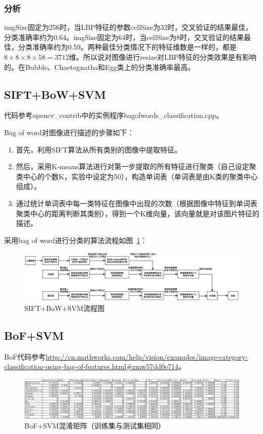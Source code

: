 \documentclass[12pt]{article}
\begin{document}
\subsubsection{分析}

imgSize固定为256时，当LBP特征的参数cellSize为32时，交叉验证的结果最佳，分类准确率约为0.64。imgSize固定为64时，当cellSize为8时，交叉验证的结果最佳，分类准确率约为0.59。两种最佳分类情况下的特征维数是一样的，都是$8\times 8 \times 8\times 58=3712$维。所以说对图像进行resize对LBP特征的分类效果是有影响的。在Bubble、Chaetognatha和Egg类上的分类准确率最高。

\subsection{SIFT+BoW+SVM}
代码参考opencv\_contrib中的实例程序bagofwords\_classification.cpp。

Bag of word对图像进行描述的步骤如下：
\begin{enumerate}
\item 首先，利用SIFT算法从所有类别的图像中提取特征。
\item 然后，采用K-means算法进行对第一步提取的所有特征进行聚类（自己设定聚类中心的个数K，实验中设定为50），构造单词表（单词表是由K类的聚类中心组成）。
\item 通过统计单词表中每一类特征在图像中出现的次数（根据图像中特征到单词表聚类中心的距离判断其类别），得到一个K维向量，该向量就是对该图片特征的描述。
\end{enumerate}

采用bag of word进行分类的算法流程如图~\ref{fig:bow}：
\begin{figure}[!ht]
\centering
\includegraphics[width=1.0\linewidth]{bowChina}
\caption{SIFT+BoW+SVM流程图}
\label{fig:bow}
\end{figure}

\subsection{BoF+SVM}
BoF代码参考\url{http://cn.mathworks.com/help/vision/examples/image-category-classification-using-bag-of-features.html#zmw57dd0e714}。
\begin{figure}[!ht]
\centering
\includegraphics[width=1.0\linewidth]{Train-CM-BoF-SVM-Linear}
\caption{BoF+SVM混淆矩阵（训练集与测试集相同）}
\label{fig:Train-CM-BoF-SVM-Linear}
\end{figure}
\end{document}
